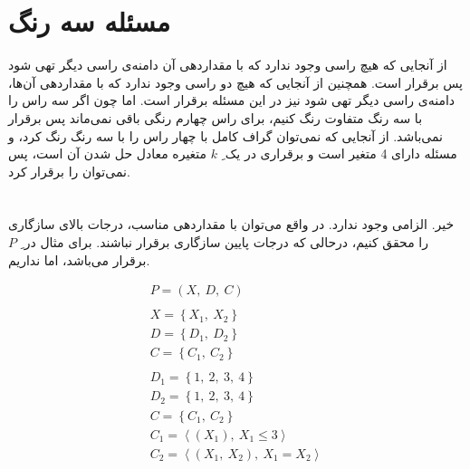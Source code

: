 \documentclass{article}
\begin{document}
\section{مسئله سه رنگ}
از آنجایی که هیچ راسی وجود ندارد که با مقداردهی آن دامنه‌ی راسی دیگر تهی شود پس   برقرار است. همچنین از آنجایی که هیچ دو راسی وجود ندارد که با مقداردهی آن‌ها، دامنه‌ی راسی دیگر تهی شود  نیز در این مسئله برقرار است. اما چون اگر سه راس را با سه رنگ متفاوت رنگ کنیم، برای راس چهارم رنگی باقی نمی‌ماند پس  برقرار نمی‌باشد. از آنجایی که نمی‌توان گراف کامل با چهار راس را با سه رنگ رنگ کرد، و مسئله دارای 4 متغیر است و برقراری  در یک ِ $k$ متغیره معادل حل شدن آن است، پس نمی‌توان  را برقرار کرد.



\section{}
\subsection{}
خیر. الزامی وجود ندارد. در واقع می‌توان با مقداردهی مناسب، درجات بالای سازگاری را محقق کنیم، درحالی که درجات پایین سازگاری برقرار نباشند. برای مثال در ِ $P$  برقرار می‌باشد، اما  نداریم. \\
\begin{fleqn}
\begin{equation}
\begin{aligned}
P = (X,\:D,\:C) \\ \\
X = \left\{ X_{1},\:X_{2} \right\} \\
D = \left\{ D_{1},\:D_{2} \right\} \\
C = \left\{ C_{1},\:C_{2} \right\} \\ \\
D_{1} = \left\{ 1,\:2,\:3,\:4 \right\} \\
D_{2} = \left\{ 1,\:2,\:3,\:4 \right\} \\
C = \left\{ C_{1},\:C_{2} \right\}\\
C_{1} = \left\langle \left( X_{1} \right),\: X_{1} \le 3 \right\rangle\\
C_{2} = \left\langle \left( X_{1},\: X_{2} \right),\: X_{1} = X_{2} \right\rangle
\end{aligned}
\end{equation}
\end{fleqn}
\end{document}
